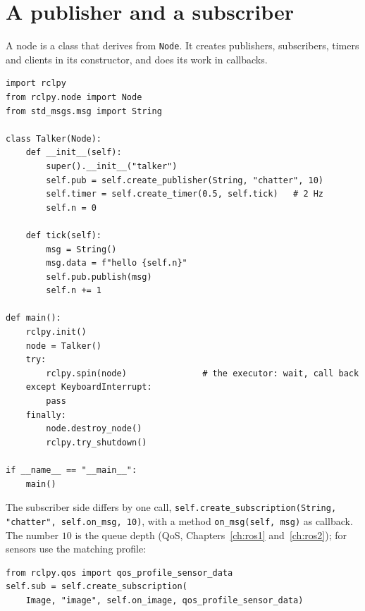 \section*{A publisher and a subscriber}
A node is a class that derives from \verb!Node!. It creates publishers, subscribers, timers and clients in its constructor, and does its work in callbacks.
\begin{verbatim}
import rclpy
from rclpy.node import Node
from std_msgs.msg import String

class Talker(Node):
    def __init__(self):
        super().__init__("talker")
        self.pub = self.create_publisher(String, "chatter", 10)
        self.timer = self.create_timer(0.5, self.tick)   # 2 Hz
        self.n = 0

    def tick(self):
        msg = String()
        msg.data = f"hello {self.n}"
        self.pub.publish(msg)
        self.n += 1

def main():
    rclpy.init()
    node = Talker()
    try:
        rclpy.spin(node)               # the executor: wait, call back
    except KeyboardInterrupt:
        pass
    finally:
        node.destroy_node()
        rclpy.try_shutdown()

if __name__ == "__main__":
    main()
\end{verbatim}
The subscriber side differs by one call, \verb!self.create_subscription(String, "chatter", self.on_msg, 10)!, with a method \verb!on_msg(self, msg)! as callback. The number $10$ is the queue depth (QoS, Chapters~\ref{ch:ros1} and~\ref{ch:ros2}); for sensors use the matching profile:
\begin{verbatim}
from rclpy.qos import qos_profile_sensor_data
self.sub = self.create_subscription(
    Image, "image", self.on_image, qos_profile_sensor_data)
\end{verbatim}


